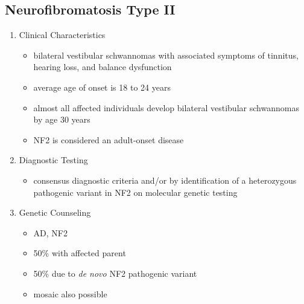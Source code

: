 \documentclass[12pt]{scrartcl}
\begin{document}
\subsection{Neurofibromatosis Type II}
\label{sec:org7fc17ad}
\begin{enumerate}
\item Clinical Characteristics
\label{sec:org79bda67}
\begin{itemize}
\item bilateral vestibular schwannomas with associated symptoms of tinnitus, hearing loss, and balance dysfunction
\item average age of onset is 18 to 24 years
\item almost all affected individuals develop bilateral vestibular
schwannomas by age 30 years
\item NF2 is considered an adult-onset disease
\end{itemize}
\item Diagnostic Testing
\label{sec:org54f183d}
\begin{itemize}
\item consensus diagnostic criteria and/or by identification of a
heterozygous pathogenic variant in NF2 on molecular genetic testing
\end{itemize}

\item Genetic Counseling
\label{sec:org5ec57c9}
\begin{itemize}
\item AD, NF2
\item 50\% with affected parent
\item 50\% due to \emph{de novo} NF2 pathogenic variant
\item mosaic also possible
\end{itemize}
\end{enumerate}
\end{document}
